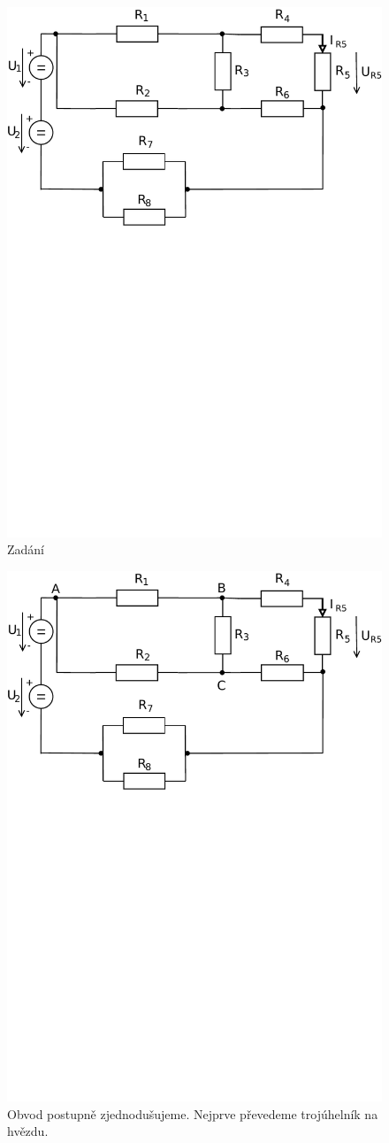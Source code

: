 \documentclass[12pt,a4paper]{article}         %
\begin{document}
    \begin{figure}[H] 
		\vspace{0cm}
		\center\includegraphics[trim={0 15cm 0 0},clip,width=0.6\linewidth]{obr/1_1}
		\caption*{Zadání}
    \end{figure}

    \begin{figure}[H] 
		\vspace{-0.6cm}
		\center\includegraphics[trim={0 15cm 0 0},clip,width=0.6\linewidth]{obr/1_2}
		\caption*{Obvod postupně zjednodušujeme. Nejprve převedeme trojúhelník na hvězdu.}
    \end{figure}
    
\end{document}
